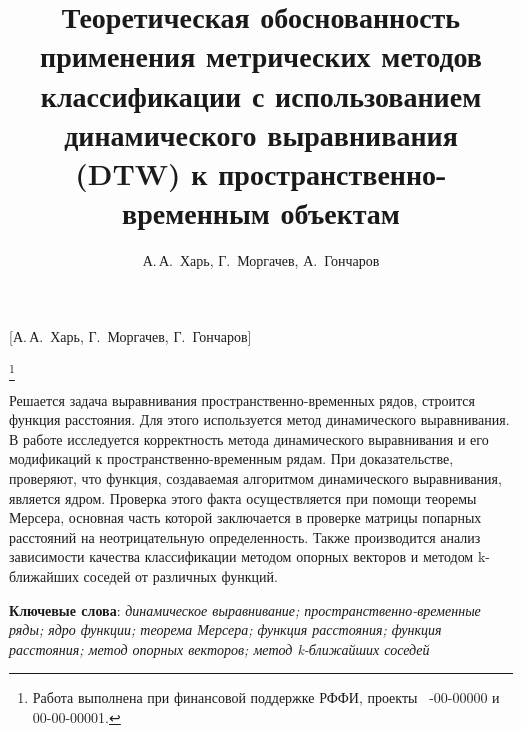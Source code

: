 \documentclass[12pt, twoside]{article}
\begin{document}
\title
    [Обоснованность применения DTW к пространственно-временным объектам] %
    {Теоретическая обоснованность применения метрических методов классификации с использованием динамического выравнивания (DTW) к пространственно-временным объектам}
\author
    [И.\,О.~Автор] %
    {А.\,А.~Харь, Г.~Моргачев, А.~Гончаров} %
    [А.\,А.~Харь, Г.~Моргачев, Г.~Гончаров] %
\email
    
\thanks
    {Работа выполнена при
     финансовой поддержке РФФИ, проекты \No\ -00-00000 и 00-00-00001.}
\organization
    
\abstract
    {Решается задача выравнивания пространственно-временных рядов, строится функция расстояния. Для этого используется метод динамического выравнивания. В работе исследуется корректность метода динамического выравнивания и его модификаций к пространственно-временным рядам. При доказательстве, проверяют, что функция, создаваемая алгоритмом динамического выравнивания, является ядром. Проверка этого факта осуществляется при помощи теоремы Мерсера, основная часть которой заключается в проверке матрицы попарных расстояний на неотрицательную определенность. Также производится анализ зависимости качества классификации методом опорных векторов и методом k-ближайших соседей от различных функций.
	
\bigskip
\noindent
\textbf{Ключевые слова}: \emph {динамическое выравнивание; пространственно-временные ряды; ядро функции; теорема Мерсера; функция расстояния; функция расстояния; метод опорных векторов; метод k-ближайших соседей}
}



\maketitle
\linenumbers
\end{document}
